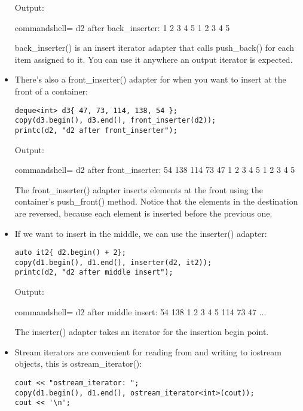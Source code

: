 \begin{itemize}
Output:

\begin{tcblisting}{commandshell={}}
d2 after back_inserter: 1 2 3 4 5 1 2 3 4 5
\end{tcblisting}

back\_inserter() is an insert iterator adapter that calls push\_back() for each item assigned to it. You can use it anywhere an output iterator is expected.

\item 
There's also a front\_inserter() adapter for when you want to insert at the front of a container:

\begin{lstlisting}[style=styleCXX]
deque<int> d3{ 47, 73, 114, 138, 54 };
copy(d3.begin(), d3.end(), front_inserter(d2));
printc(d2, "d2 after front_inserter");
\end{lstlisting}

Output:

\begin{tcblisting}{commandshell={}}
d2 after front_inserter: 54 138 114 73 47 1 2 3 4 5 1 2 3 4 5
\end{tcblisting}

The front\_inserter() adapter inserts elements at the front using the container's push\_front() method. Notice that the elements in the destination are reversed, because each element is inserted before the previous one.

\item 
If we want to insert in the middle, we can use the inserter() adapter:

\begin{lstlisting}[style=styleCXX]
auto it2{ d2.begin() + 2};
copy(d1.begin(), d1.end(), inserter(d2, it2));
printc(d2, "d2 after middle insert");
\end{lstlisting}

Output:

\begin{tcblisting}{commandshell={}}
d2 after middle insert: 54 138 1 2 3 4 5 114 73 47 ...
\end{tcblisting}

The inserter() adapter takes an iterator for the insertion begin point.

\item 
Stream iterators are convenient for reading from and writing to iostream objects, this is ostream\_iterator():

\begin{lstlisting}[style=styleCXX]
cout << "ostream_iterator: ";
copy(d1.begin(), d1.end(), ostream_iterator<int>(cout));
cout << '\n';
\end{lstlisting}


\end{itemize}
